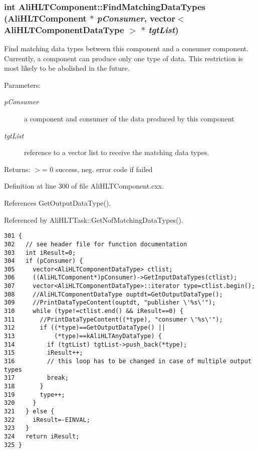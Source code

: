 \subsubsection{\setlength{\rightskip}{0pt plus 5cm}int Ali\-HLTComponent::Find\-Matching\-Data\-Types ({\bf Ali\-HLTComponent} $\ast$ {\em p\-Consumer}, vector$<$ {\bf Ali\-HLTComponent\-Data\-Type} $>$ $\ast$ {\em tgt\-List})}\label{classAliHLTComponent_a14}


Find matching data types between this component and a consumer component. Currently, a component can produce only one type of data. This restriction is most likely to be abolished in the future. \begin{Desc}
\item[Parameters:]
\begin{description}
\item[{\em p\-Consumer}]a component and consumer of the data produced by this component \item[{\em tgt\-List}]reference to a vector list to receive the matching data types. \end{description}
\end{Desc}
\begin{Desc}
\item[Returns:]$>$= 0 success, neg. error code if failed \end{Desc}


Definition at line 300 of file Ali\-HLTComponent.cxx.

References Get\-Output\-Data\-Type().

Referenced by Ali\-HLTTask::Get\-Nof\-Matching\-Data\-Types().

\footnotesize\begin{verbatim}301 {
302   // see header file for function documentation
303   int iResult=0;
304   if (pConsumer) {
305     vector<AliHLTComponentDataType> ctlist;
306     ((AliHLTComponent*)pConsumer)->GetInputDataTypes(ctlist);
307     vector<AliHLTComponentDataType>::iterator type=ctlist.begin();
308     //AliHLTComponentDataType ouptdt=GetOutputDataType();
309     //PrintDataTypeContent(ouptdt, "publisher \'%s\'");
310     while (type!=ctlist.end() && iResult==0) {
311       //PrintDataTypeContent((*type), "consumer \'%s\'");
312       if ((*type)==GetOutputDataType() ||
313           (*type)==kAliHLTAnyDataType) {
314         if (tgtList) tgtList->push_back(*type);
315         iResult++;
316         // this loop has to be changed in case of multiple output types
317         break;
318       }
319       type++;
320     }
321   } else {
322     iResult=-EINVAL;
323   }
324   return iResult;
325 }
\end{verbatim}\normalsize 


